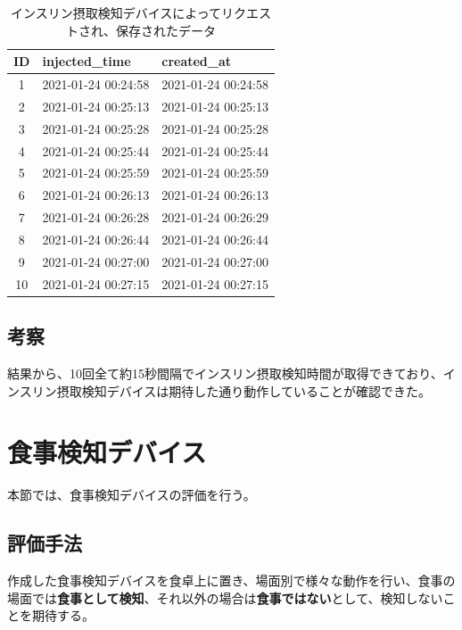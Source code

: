 \begin{table}[htbp]
  \caption{インスリン摂取検知デバイスによってリクエストされ、保存されたデータ}
  \label{tb:insulin_detection_time}
  \begin{center}
    \begin{tabular}{|c||l|l|}
      \hline
      ID & injected\_time & created\_at \\\hline
      1 & 2021-01-24 00:24:58 & 2021-01-24 00:24:58 \\\hline
      2 & 2021-01-24 00:25:13 & 2021-01-24 00:25:13 \\\hline
      3 & 2021-01-24 00:25:28 & 2021-01-24 00:25:28 \\\hline
      4 & 2021-01-24 00:25:44 & 2021-01-24 00:25:44 \\\hline
      5 & 2021-01-24 00:25:59 & 2021-01-24 00:25:59 \\\hline
      6 & 2021-01-24 00:26:13 & 2021-01-24 00:26:13 \\\hline
      7 & 2021-01-24 00:26:28 & 2021-01-24 00:26:29 \\\hline
      8 & 2021-01-24 00:26:44 & 2021-01-24 00:26:44 \\\hline
      9 & 2021-01-24 00:27:00 & 2021-01-24 00:27:00 \\\hline
      10 & 2021-01-24 00:27:15 & 2021-01-24 00:27:15 \\\hline
    \end{tabular}
  \end{center}
\end{table}

\subsection{考察}

結果から、10回全て約15秒間隔でインスリン摂取検知時間が取得できており、インスリン摂取検知デバイスは期待した通り動作していることが確認できた。

\section{食事検知デバイス}
\label{section:meal_detect_eval}

本節では、食事検知デバイスの評価を行う。

\subsection{評価手法}
作成した食事検知デバイスを食卓上に置き、場面別で様々な動作を行い、食事の場面では\textbf{食事として検知}、それ以外の場合は\textbf{食事ではない}として、検知しないことを期待する。

